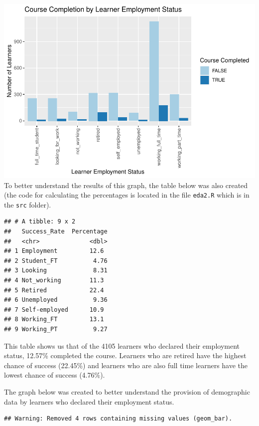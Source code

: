 \documentclass[
]{article}
\begin{document}
\includegraphics{CSC8631-Report---210431461_files/figure-latex/employment_status_completion-1.pdf}
To better understand the results of this graph, the table below was also
created (the code for calculating the percentages is located in the file
\texttt{eda2.R} which is in the \texttt{src} folder).

\begin{verbatim}
## # A tibble: 9 x 2
##   Success_Rate  Percentage
##   <chr>              <dbl>
## 1 Employment         12.6 
## 2 Student_FT          4.76
## 3 Looking             8.31
## 4 Not_working        11.3 
## 5 Retired            22.4 
## 6 Unemployed          9.36
## 7 Self-employed      10.9 
## 8 Working_FT         13.1 
## 9 Working_PT          9.27
\end{verbatim}

This table shows us that of the 4105 learners who declared their
employment status, 12.57\% completed the course. Learners who are
retired have the highest chance of success (22.45\%) and learners who
are also full time learners have the lowest chance of success (4.76\%).

The graph below was created to better understand the provision of
demographic data by learners who declared their employment status.

\begin{verbatim}
## Warning: Removed 4 rows containing missing values (geom_bar).
\end{verbatim}
\end{document}
